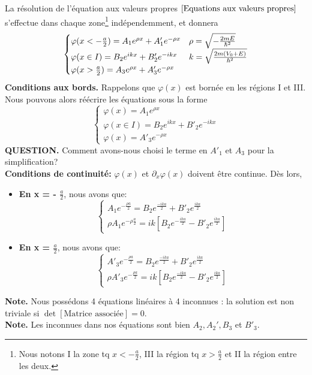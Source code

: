 \documentclass[../notesdecours]{subfiles}
\begin{document}
La résolution de l'équation aux valeurs propres $\eqref{Equations aux valeurs propres}$ s'effectue dans chaque zone\footnote{Nous notons I la zone tq $x < -\frac{a}{2}$, III la région tq $x>\frac{a}{2}$ et II la région entre les deux.} indépendemment, et donnera
\begin{equation}
\begin{cases}
\varphi(x < -\frac{a}{2}) = A_1e^{\rho x} + A'_1e^{-\rho x}		&\rho = \sqrt{- \frac{2mE}{\hbar^2}}\\
\varphi(x \in I) = B_2e^{ikx} + B'_2e^{-ikx} 					&k = \sqrt{\frac{2m(V_0+E)}{\hbar^2}}\\
\varphi(x>\frac{a}{2}) = A_3e^{\rho x} + A'_3e^{-\rho x}
\end{cases}
\end{equation}
\textbf{Conditions aux bords.} Rappelons que $\varphi(x)$ est bornée en les régions I et III. Nous pouvons alors réécrire les équations sous la forme
\begin{equation}
\begin{cases}
\varphi(x) = A_1e^{\rho x}\\
\varphi(x \in I) = B_2e^{ikx} + B'_2e^{-ikx}\\
\varphi(x) = A'_3e^{-\rho x}
\end{cases}
\end{equation}
\textbf{QUESTION.} Comment avons-nous choisi le terme en $A'_1$ et $A_3$ pour la simplification?\\

\textbf{Conditions de continuité:} $\varphi(x)$ et $\partial_x \varphi(x)$ doivent être continue. Dès lors,
\begin{itemize}
\item \textbf{En x = - $\frac{a}{2}$}, nous avons que:
\begin{equation}
\begin{cases}
A_1e^{-\frac{\rho a}{2}} = B_2e^{\frac{-ika}{2}} + B'_2e^{\frac{ika}{2}}\\
\rho A_1e^{-\rho\frac{a}{2}} = ik \left[B_2e^{-\frac{ika}{2}} - B'_2e^{\frac{ika}{2}} \right]
\end{cases}
\label{Continuité en -a/2}
\end{equation}
\item \textbf{En x = $\frac{a}{2}$}, nous avons que:
\begin{equation}
\begin{cases}
A'_3e^{-\frac{\rho a}{2}} = B_2e^{\frac{-ika}{2}} + B'_2e^{\frac{ika}{2}}\\
\rho A'_3e^{-\frac{\rho a}{2}} = ik \left[B_2e^{\frac{-ika}{2}} - B'_2e^{\frac{ika}{2}}\right]
\end{cases}
\label{Continuité en a/2}
\end{equation}
\end{itemize}
\textbf{Note.} Nous possédons 4 équations linéaires à 4 inconnues : la solution est non triviale si $\det \left[ \text{Matrice associée} \right] = 0$.\\
\textbf{Note.} Les inconnues dans nos équations sont bien $A_2,A_2',B_3$ et $B'_3$.\\
\end{document}
